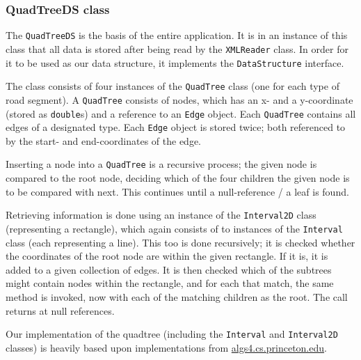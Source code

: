 \documentclass[a4paper,11pt]{article}
\begin{document}
\subsubsection{QuadTreeDS class} %
The \texttt{QuadTreeDS} is the basis of the entire application. It is in an instance of this class that all data is stored after being read by the \texttt{XMLReader} class. In order for it to be used as our data structure, it implements the \texttt{DataStructure} interface.

The class consists of four instances of the \texttt{QuadTree} class (one for each type of road segment). A \texttt{QuadTree} consists of nodes, which has an x- and a y-coordinate (stored as \texttt{double}s) and a reference to an \texttt{Edge} object. Each \texttt{QuadTree} contains all edges of a designated type. Each \texttt{Edge} object is stored twice; both referenced to by the start- and end-coordinates of the edge.

Inserting a node into a \texttt{QuadTree} is a recursive process; the given node is compared to the root node, deciding which of the four children the given node is to be compared with next. This continues until a null-reference / a leaf is found.

Retrieving information is done using an instance of the \texttt{Interval2D} class (representing a rectangle), which again consists of to instances of the \texttt{Interval} class (each representing a line). This too is done recursively; it is checked whether the coordinates of the root node are within the given rectangle. If it is, it is added to a given collection of edges. It is then checked which of the subtrees might contain nodes within the rectangle, and for each that match, the same method is invoked, now with each of the matching children as the root. The call returns at null references.

Our implementation of the quadtree (including the \texttt{Interval} and \texttt{Interval2D} classes) is heavily based upon implementations from
\url{algs4.cs.princeton.edu}.

\end{document}
